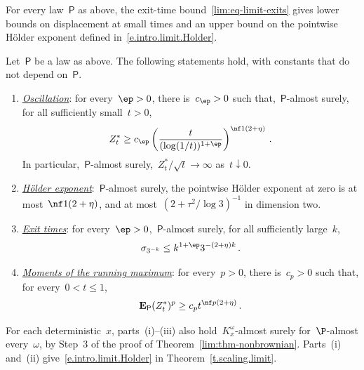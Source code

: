 \documentclass[11pt]{amsart}
\begin{document}
For every law~$\mathsf P$ as above, the exit-time bound~\eqref{lim:eq-limit-exits} gives lower bounds on displacement at small times and an upper bound on the pointwise H\"older exponent defined in~\eqref{e.intro.limit.Holder}.

\begin{corollary}
\label{lim:cor-paths}
Let~$\mathsf P$ be a law as above. The following statements hold, with constants that do not depend on~$\mathsf P$.
\begin{enumerate}[label=(\roman*)]
\item \underline{\emph{Oscillation}}: for every~$\ep>0$, there is~$c_\ep>0$ such that,~$\mathsf P$-almost surely, for all sufficiently small~$t>0$,
\begin{equation}
	Z^*_t\geq c_\ep
	\left(\frac{t}{(\log(1/t))^{1+\ep}}\right)^{\nf1{(2+\eta)}}\,.
	\label{lim:eq-oscillation}
\end{equation}
In particular,~$\mathsf P$-almost surely,~$Z^*_t/\sqrt t\to\infty$ as~$t\downarrow0$.

\item \underline{\emph{H\"older exponent}}:~$\mathsf P$-almost surely, the pointwise H\"older exponent at zero is at most~$\nf1{(2+\eta)}$, and at most~$(2+\tau^2/\log3)^{-1}$ in dimension two.

\item \underline{\emph{Exit times}}: for every~$\ep>0$,~$\mathsf P$-almost surely, for all sufficiently large~$k$,
\begin{equation}
	\sigma_{3^{-k}}\leq k^{1+\ep}3^{-(2+\eta)k}\,.
	\label{lim:eq-endpoint-exits}
\end{equation}

\item \underline{\emph{Moments of the running maximum}}: for every~$p>0$, there is~$c_p>0$ such that, for every~$0<t\leq1$,
\begin{equation}
	\mathbf E_{\mathsf P}(Z^*_t)^p\geq c_pt^{\nf p{(2+\eta)}}\,.
	\label{lim:eq-maximal-moments}
\end{equation}
\end{enumerate}
\end{corollary}

For each deterministic~$x$, parts~(i)--(iii) also hold~$K_x^\omega$-almost surely for~$\P$-almost every~$\omega$, by Step~3 of the proof of Theorem~\ref{lim:thm-nonbrownian}. Parts~(i) and~(ii) give~\eqref{e.intro.limit.Holder} in Theorem~\ref{t.scaling.limit}.
\end{document}
